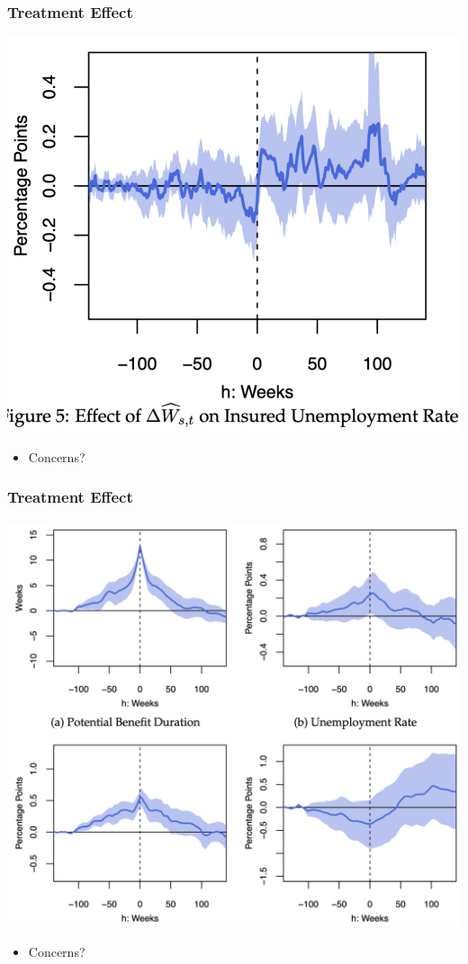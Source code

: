 \documentclass[english,xcolor=svgnames]{beamer}
\begin{document}
\begin{frame}
	\frametitle[alignment=center]{Treatment Effect}
	\begin{center}
		\includegraphics[scale=0.3]{figures/AMNSFIG5.png}
	\end{center}
	\begin{itemize}
		\item Concerns?
	\end{itemize}
\end{frame}


\begin{frame}
	\frametitle[alignment=center]{Treatment Effect}
	\begin{center}
		\includegraphics[scale=0.3]{figures/AMNSFIG6.png}
	\end{center}
	\begin{itemize}
		\item Concerns?
	\end{itemize}
\end{frame}
\end{document}
